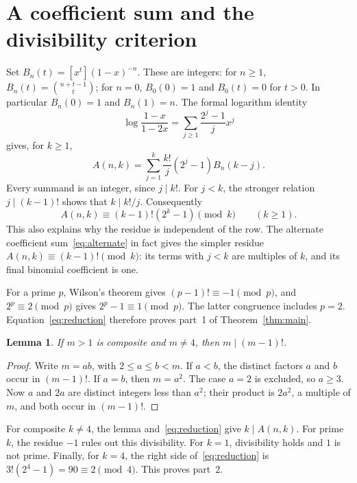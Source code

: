 \documentclass[11pt]{article}
\newtheorem{lemma}[theorem]{Lemma}
\begin{document}
\section{A coefficient sum and the divisibility criterion}
Set $B_n(t)=[x^t](1-x)^{-n}$. These are integers: for $n\geq1$,
$B_n(t)=\binom{n+t-1}{t}$; for $n=0$, $B_0(0)=1$ and
$B_0(t)=0$ for $t>0$. In particular $B_n(0)=1$ and $B_n(1)=n$.
The formal logarithm identity
\[
 \log\frac{1-x}{1-2x}=\sum_{j\geq1}\frac{2^j-1}{j}x^j
\]
gives, for $k\geq1$,
\begin{equation}\label{eq:sum}
 A(n,k)=\sum_{j=1}^k\frac{k!}{j}(2^j-1)B_n(k-j).
\end{equation}
Every summand is an integer, since $j\mid k!$.
For $j<k$, the stronger relation $j\mid(k-1)!$ shows that
$k\mid k!/j$. Consequently
\begin{equation}\label{eq:reduction}
 A(n,k)\equiv(k-1)!(2^k-1)\pmod k\qquad(k\geq1).
\end{equation}
This also explains why the residue is independent of the row.
The alternate coefficient sum~\eqref{eq:alternate} in fact gives the
simpler residue $A(n,k)\equiv(k-1)!\pmod k$: its terms with $j<k$
are multiples of $k$, and its final binomial coefficient is one.

For a prime $p$, Wilson's theorem gives $(p-1)!\equiv-1\pmod p$,
and $2^p\equiv2\pmod p$ gives $2^p-1\equiv1\pmod p$.
The latter congruence includes $p=2$. Equation~\eqref{eq:reduction}
therefore proves part~1 of Theorem~\ref{thm:main}.

\begin{lemma}\label{lem:factorial}
If $m>1$ is composite and $m\ne4$, then $m\mid(m-1)!$.
\end{lemma}
\begin{proof}
Write $m=ab$, with $2\leq a\leq b<m$. If $a<b$, the distinct
factors $a$ and $b$ occur in $(m-1)!$. If $a=b$, then $m=a^2$.
The case $a=2$ is excluded, so $a\geq3$. Now $a$ and $2a$ are
distinct integers less than $a^2$; their product is $2a^2$, a
multiple of $m$, and both occur in $(m-1)!$.
\end{proof}

For composite $k\ne4$, the lemma and~\eqref{eq:reduction} give
$k\mid A(n,k)$. For prime $k$, the residue $-1$ rules out this
divisibility. For $k=1$, divisibility holds and $1$ is not prime.
Finally, for $k=4$, the right side of~\eqref{eq:reduction} is
$3!(2^4-1)=90\equiv2\pmod4$. This proves part~2.
\end{document}
